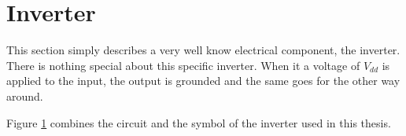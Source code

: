 \section{Inverter}
\label{sec:inv}

This section simply describes a very well know electrical component, the inverter. There is nothing special about this specific inverter. When it a voltage of $V_{dd}$ is applied to the input, the output is grounded and the same goes for the other way around.

\begin{figure}[H]
  \centering
  \hspace*{2.5cm}
  \hfill
  \hspace*{1.5cm}
  \caption{}
  \label{fig:inv}
\end{figure}

Figure \ref{fig:inv} combines the circuit and the symbol of the inverter used in this thesis.

